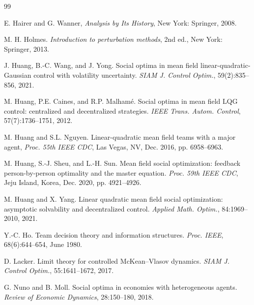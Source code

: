 \documentclass{amsart}
\theoremstyle{definition}
\theoremstyle{remark}
\numberwithin{equation}{section}
\begin{document}
\begin{thebibliography}{99}




E. Hairer and G. Wanner, {\it Analysis by Its History}, New York: Springer, 2008.


M. H. Holmes.
{\it Introduction to perturbation methods},
2nd ed., New York: Springer, 2013.


J. Huang, B.-C. Wang, and J. Yong.
Social optima in mean field linear-quadratic-Gaussian control with volatility uncertainty. {\it SIAM J. Control Optim.},
59(2):835--856,  2021.


M. Huang, P.E. Caines, and R.P. Malham\'e. Social optima in mean field LQG control: centralized and decentralized strategies. {\it IEEE Trans. Autom. Control}, 57(7):1736--1751,  2012.






M. Huang and S.L. Nguyen. Linear-quadratic mean field teams with a
major agent, {\it  Proc. 55th IEEE CDC},  Las Vegas, NV, Dec. 2016, pp. 6958--6963.

M. Huang, S.-J. Sheu, and L.-H. Sun. Mean field social optimization: feedback person-by-person optimality and the master equation. {\it Proc. 59th IEEE CDC}, Jeju Island, Korea, Dec. 2020, pp. 4921--4926.

M. Huang and X. Yang. Linear quadratic mean field social optimization: asymptotic solvability and decentralized control. {\it Applied Math. Optim.},  84:1969--2010, 2021.


Y.-C. Ho. Team decision theory and information structures. {\it
Proc. IEEE},  68(6):644--654, June 1980.










D. Lacker.
Limit theory for controlled McKean--Vlasov dynamics.
{\it SIAM J. Control Optim.},  55:1641--1672, 2017.









G. Nuno and B. Moll.
Social optima in economies with heterogeneous agents.
{\it Review of
Economic Dynamics}, 28:150--180, 2018.



\end{thebibliography}
\end{document}
